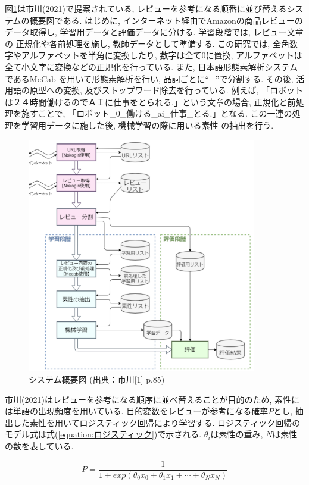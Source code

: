 \documentclass{ltjarticle}
\begin{document}
図\ref{fig:関連研究1システム概要図}は市川(2021)で提案されている, レビューを参考になる順番に並び替えるシステムの概要図である. はじめに, 
インターネット経由でAmazonの商品レビューのデータ取得し, 学習用データと評価データに分ける. 学習段階では, レビュー文章の
正規化や各前処理を施し, 教師データとして準備する. 
この研究では, 全角数字やアルファベットを半角に変換したり, 
数字は全て0に置換, アルファベットは全て小文字に変換などの正規化を行っている. また, 日本語形態素解析システムであるMeCab
を用いて形態素解析を行い, 品詞ごとに``\_''で分割する. その後, 活用語の原型への変換, 及びストップワード除去を行っている.
例えば, 「ロボットは２４時間働けるのでＡＩに仕事をとられる.」という文章の場合, 正規化と前処理を施すことで, 
「ロボット\_0\_働ける\_ai\_仕事\_とる.」となる. この一連の処理を学習用データに施した後, 機械学習の際に用いる素性
の抽出を行う. 
\begin{figure}[h]
    \centering
    \includegraphics[width=10cm]{images/system1.png}
    \caption{システム概要図 (出典：市川[1] p.85)}
    \label{fig:関連研究1システム概要図}
\end{figure}
市川(2021)はレビューを参考になる順序に並べ替えることが目的のため, 素性には単語の出現頻度を用いている. 
目的変数をレビューが参考になる確率$P$とし, 抽出した素性を用いてロジスティック回帰により学習する. 
ロジスティック回帰のモデル式は式(\ref{equation:ロジスティック})で示される. $\theta_i$は素性の重み, $N$は素性の数を表している. 
\vspace{5truept}

\begin{equation}
    P=\dfrac{1}{1+exp(\theta_0x_0+\theta_1x_1+\cdots+\theta_Nx_N)}
    \label{equation:ロジスティック}
\end{equation}
\vspace{5truept}
\end{document}
